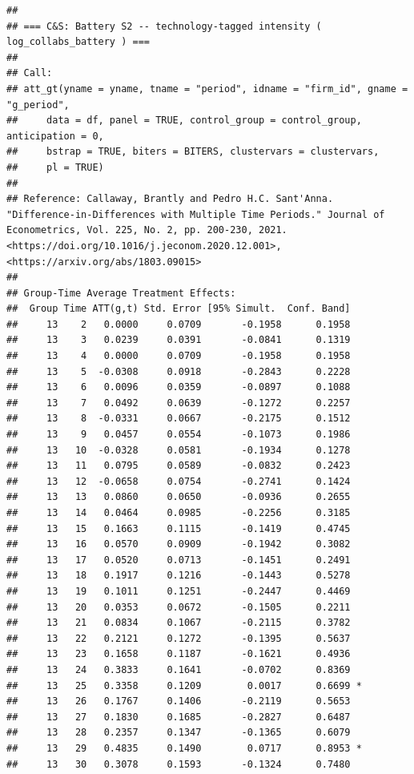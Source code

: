 \documentclass[
]{article}
\begin{document}
\begin{verbatim}
## 
## === C&S: Battery S2 -- technology-tagged intensity ( log_collabs_battery ) ===
## 
## Call:
## att_gt(yname = yname, tname = "period", idname = "firm_id", gname = "g_period", 
##     data = df, panel = TRUE, control_group = control_group, anticipation = 0, 
##     bstrap = TRUE, biters = BITERS, clustervars = clustervars, 
##     pl = TRUE)
## 
## Reference: Callaway, Brantly and Pedro H.C. Sant'Anna.  "Difference-in-Differences with Multiple Time Periods." Journal of Econometrics, Vol. 225, No. 2, pp. 200-230, 2021. <https://doi.org/10.1016/j.jeconom.2020.12.001>, <https://arxiv.org/abs/1803.09015> 
## 
## Group-Time Average Treatment Effects:
##  Group Time ATT(g,t) Std. Error [95% Simult.  Conf. Band]  
##     13    2   0.0000     0.0709       -0.1958      0.1958  
##     13    3   0.0239     0.0391       -0.0841      0.1319  
##     13    4   0.0000     0.0709       -0.1958      0.1958  
##     13    5  -0.0308     0.0918       -0.2843      0.2228  
##     13    6   0.0096     0.0359       -0.0897      0.1088  
##     13    7   0.0492     0.0639       -0.1272      0.2257  
##     13    8  -0.0331     0.0667       -0.2175      0.1512  
##     13    9   0.0457     0.0554       -0.1073      0.1986  
##     13   10  -0.0328     0.0581       -0.1934      0.1278  
##     13   11   0.0795     0.0589       -0.0832      0.2423  
##     13   12  -0.0658     0.0754       -0.2741      0.1424  
##     13   13   0.0860     0.0650       -0.0936      0.2655  
##     13   14   0.0464     0.0985       -0.2256      0.3185  
##     13   15   0.1663     0.1115       -0.1419      0.4745  
##     13   16   0.0570     0.0909       -0.1942      0.3082  
##     13   17   0.0520     0.0713       -0.1451      0.2491  
##     13   18   0.1917     0.1216       -0.1443      0.5278  
##     13   19   0.1011     0.1251       -0.2447      0.4469  
##     13   20   0.0353     0.0672       -0.1505      0.2211  
##     13   21   0.0834     0.1067       -0.2115      0.3782  
##     13   22   0.2121     0.1272       -0.1395      0.5637  
##     13   23   0.1658     0.1187       -0.1621      0.4936  
##     13   24   0.3833     0.1641       -0.0702      0.8369  
##     13   25   0.3358     0.1209        0.0017      0.6699 *
##     13   26   0.1767     0.1406       -0.2119      0.5653  
##     13   27   0.1830     0.1685       -0.2827      0.6487  
##     13   28   0.2357     0.1347       -0.1365      0.6079  
##     13   29   0.4835     0.1490        0.0717      0.8953 *
##     13   30   0.3078     0.1593       -0.1324      0.7480  

\end{verbatim}
\end{document}
